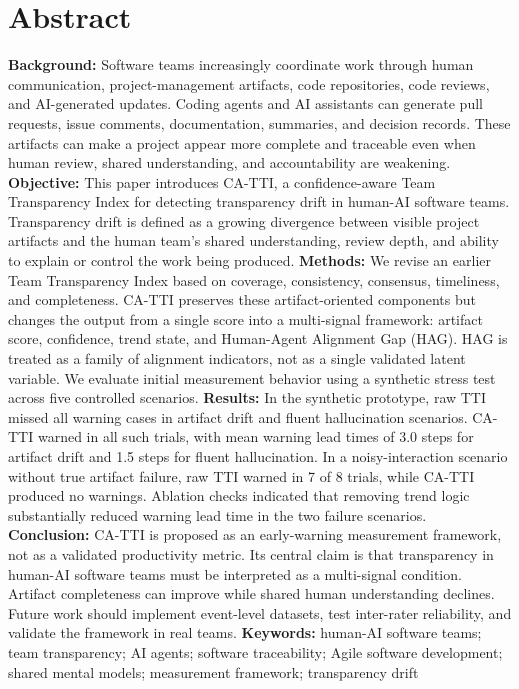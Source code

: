 \documentclass[11pt]{article}
\begin{document}
\section{Abstract}
\textbf{Background:} Software teams increasingly coordinate work through human communication, project-management artifacts, code repositories, code reviews, and AI-generated updates. Coding agents and AI assistants can generate pull requests, issue comments, documentation, summaries, and decision records. These artifacts can make a project appear more complete and traceable even when human review, shared understanding, and accountability are weakening.
\textbf{Objective:} This paper introduces CA-TTI, a confidence-aware Team Transparency Index for detecting transparency drift in human-AI software teams. Transparency drift is defined as a growing divergence between visible project artifacts and the human team's shared understanding, review depth, and ability to explain or control the work being produced.
\textbf{Methods:} We revise an earlier Team Transparency Index based on coverage, consistency, consensus, timeliness, and completeness. CA-TTI preserves these artifact-oriented components but changes the output from a single score into a multi-signal framework: artifact score, confidence, trend state, and Human-Agent Alignment Gap (HAG). HAG is treated as a family of alignment indicators, not as a single validated latent variable. We evaluate initial measurement behavior using a synthetic stress test across five controlled scenarios.
\textbf{Results:} In the synthetic prototype, raw TTI missed all warning cases in artifact drift and fluent hallucination scenarios. CA-TTI warned in all such trials, with mean warning lead times of 3.0 steps for artifact drift and 1.5 steps for fluent hallucination. In a noisy-interaction scenario without true artifact failure, raw TTI warned in 7 of 8 trials, while CA-TTI produced no warnings. Ablation checks indicated that removing trend logic substantially reduced warning lead time in the two failure scenarios.
\textbf{Conclusion:} CA-TTI is proposed as an early-warning measurement framework, not as a validated productivity metric. Its central claim is that transparency in human-AI software teams must be interpreted as a multi-signal condition. Artifact completeness can improve while shared human understanding declines. Future work should implement event-level datasets, test inter-rater reliability, and validate the framework in real teams.
\textbf{Keywords:} human-AI software teams; team transparency; AI agents; software traceability; Agile software development; shared mental models; measurement framework; transparency drift
\end{document}
